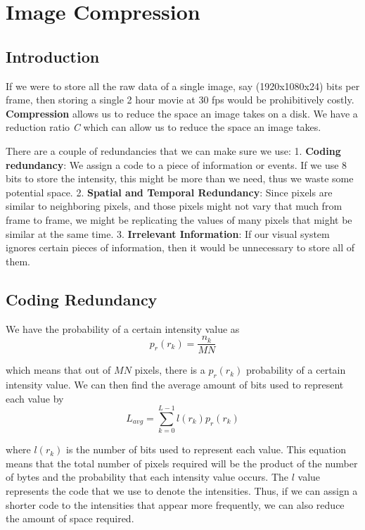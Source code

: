 \documentclass{tufte-handout}
\begin{document}
\section{Image Compression}

\subsection{Introduction}

If we were to store all the raw data of a single image, say
(1920x1080x24) bits per frame, then storing a single 2 hour movie at 30
fps would be prohibitively costly. \textbf{Compression} allows us to
reduce the space an image takes on a disk. We have a reduction ratio
\emph{C} which can allow us to reduce the space an image takes.


There are a couple of redundancies that we can make sure we use: 1.
\textbf{Coding redundancy}: We assign a code to a piece of information
or events. If we use 8 bits to store the intensity, this might be more
than we need, thus we waste some potential space. 2. \textbf{Spatial and
Temporal Redundancy}: Since pixels are similar to neighboring pixels,
and those pixels might not vary that much from frame to frame, we might
be replicating the values of many pixels that might be similar at the
same time. 3. \textbf{Irrelevant Information}: If our visual system
ignores certain pieces of information, then it would be unnecessary to
store all of them.

\subsection{Coding Redundancy}

We have the probability of a certain intensity value as
\[p_{r}(r_{k}) = \frac{n_{k}}{MN}\]

which means that out of $MN$ pixels, there is a $p_{r}(r_{k})$ probability of a
certain intensity value. We can then find the average amount of bits used to 
represent each value by 
\[L_{avg} = \sum_{k=0}^{L-1}l(r_{k})p_{r}(r_{k})\]

where $l(r_{k})$ is the number of bits used to represent each value. This equation
means that the total number of pixels required will be the product of the number of 
bytes and the probability that each intensity value occurs. The $l$ value 
represents the code that we use to denote the intensities. Thus, if we can assign
a shorter code to the intensities that appear more frequently, we can also reduce the 
amount of space required. 
\end{document}
